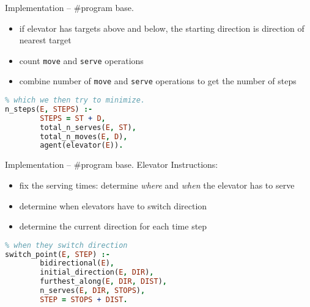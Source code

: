 \documentclass{beamer}
\begin{document}

\begin{frame}[fragile]{Implementation -- \#program base.}

  \begin{itemize}
    \item if elevator has targets above and below, the starting direction is direction of nearest target
    \item count \texttt{move} and \texttt{serve} operations
    \item combine number of \texttt{move} and \texttt{serve} operations to get the number of steps
  \end{itemize}

\begin{lstlisting}[language=Prolog]
% Combine serves and moves to get number of steps,
% which we then try to minimize.
n_steps(E, STEPS) :-
        STEPS = ST + D,
        total_n_serves(E, ST),
        total_n_moves(E, D),
        agent(elevator(E)).

\end{lstlisting}


\end{frame}


\begin{frame}[fragile]{Implementation -- \#program base.}
  Elevator Instructions:
  \begin{itemize}
    \item fix the serving times: determine \textit{where} and \textit{when} the elevator has to serve
    \item determine when elevators have to switch direction
    \item determine the current direction for each time step
  \end{itemize}

\begin{lstlisting}[language=Prolog]
% For bidirectional elevators we need to know
% when they switch direction
switch_point(E, STEP) :-
        bidirectional(E),
        initial_direction(E, DIR),
        furthest_along(E, DIR, DIST),
        n_serves(E, DIR, STOPS),
        STEP = STOPS + DIST.
\end{lstlisting}

\end{frame}
\end{document}
